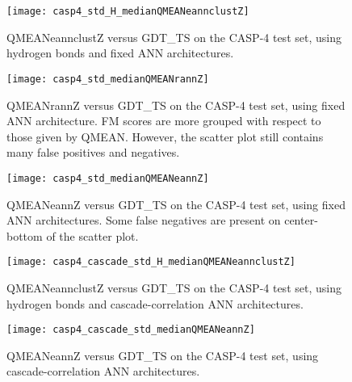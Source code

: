 \begin{figure}[H]
	\begin{center}
		\texttt{[image: casp4\_std\_H\_medianQMEANeannclustZ]}
		\caption[QMEANeannclustZ versus GDT\_TS on the CASP-4 test set, using hydrogen bonds and fixed ANN architectures]{QMEANeannclustZ versus GDT\_TS on the CASP-4 test set, using hydrogen bonds and fixed ANN architectures.}
		\label{fig:casp4_std_H_medianQMEANeannclustZ}
	\end{center}
\end{figure}

\begin{figure}[H]
	\begin{center}
		\texttt{[image: casp4\_std\_medianQMEANrannZ]}
		\caption[QMEANrannZ versus GDT\_TS on the CASP-4 test set, using fixed ANN architecture]{QMEANrannZ versus GDT\_TS on the CASP-4 test set, using fixed ANN architecture. FM scores are more grouped with respect to those given by QMEAN. However, the scatter plot still contains many false positives and negatives.}
		\label{fig:casp4_std_medianQMEANrannZ}
	\end{center}
\end{figure}

\begin{figure}[H]
	\begin{center}
		\texttt{[image: casp4\_std\_medianQMEANeannZ]}
		\caption[QMEANeannZ versus GDT\_TS on the CASP-4 test set, using fixed ANN architectures]{QMEANeannZ versus GDT\_TS on the CASP-4 test set, using fixed ANN architectures. Some false negatives are present on center-bottom of the scatter plot.}
		\label{fig:casp4_std_medianQMEANeannZ}
	\end{center}
\end{figure}

\begin{figure}[H]
	\begin{center}
		\texttt{[image: casp4\_cascade\_std\_H\_medianQMEANeannclustZ]}
		\caption[QMEANeannclustZ versus GDT\_TS on the CASP-4 test set, using hydrogen bonds and ca\-sca\-de-\-cor\-re\-la\-tion ANN architectures]{QMEANeannclustZ versus GDT\_TS on the CASP-4 test set, using hydrogen bonds and ca\-sca\-de-\-cor\-re\-la\-tion ANN architectures.}
	\label{fig:casp4_cascade_std_H_medianQMEANeannclustZ}
	\end{center}
\end{figure}

\begin{figure}[H]
	\begin{center}
		\texttt{[image: casp4\_cascade\_std\_medianQMEANeannZ]}
		\caption[QMEANeannZ versus GDT\_TS on the CASP-4 test set, using ca\-sca\-de-\-cor\-re\-la\-tion ANN architectures]{QMEANeannZ versus GDT\_TS on the CASP-4 test set, using ca\-sca\-de-\-cor\-re\-la\-tion ANN architectures.}
	\label{fig:casp4_cascade_std_medianQMEANeannZ}
	\end{center}
\end{figure}

